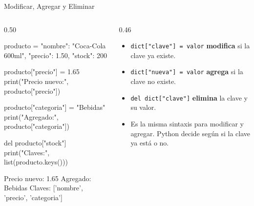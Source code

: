 \documentclass[aspectratio=169, 11pt]{beamer}
\begin{document}
\begin{frame}[fragile,shrink=30]{Modificar, Agregar y Eliminar}
  \vspace{-6pt}
  \begin{columns}[T]
    \begin{column}{0.50\textwidth}
      \begin{pyblock}
producto = {
    "nombre": "Coca-Cola 600ml",
    "precio": 1.50,
    "stock": 200
}

producto["precio"] = 1.65
print("Precio nuevo:", producto["precio"])

producto["categoria"] = "Bebidas"
print("Agregado:", producto["categoria"])

del producto["stock"]
print("Claves:", list(producto.keys()))
      \end{pyblock}
      \vspace{-2pt}
      \begin{outputblock}
Precio nuevo: 1.65
Agregado: Bebidas
Claves: ['nombre', 'precio', 'categoria']
      \end{outputblock}
    \end{column}

    \begin{column}{0.46\textwidth}
      \vspace{2pt}
      {\scriptsize\color{textMuted}
      \begin{itemize}\setlength{\itemsep}{4pt}
        \item[{\color{arcaRed}\scriptsize\faArrowRight}]
          \texttt{dict["clave"] = valor}
          \textbf{modifica} si la clave ya existe.
        \item[{\color{arcaRed}\scriptsize\faArrowRight}]
          \texttt{dict["nueva"] = valor}
          \textbf{agrega} si la clave no existe.
        \item[{\color{arcaRed}\scriptsize\faArrowRight}]
          \texttt{del dict["clave"]} \textbf{elimina}
          la clave y su valor.
        \item[{\color{arcaRed}\scriptsize\faLightbulb}]
          Es la misma sintaxis para modificar
          y agregar. Python decide según si
          la clave ya está o no.
      \end{itemize}
      }
    \end{column}
  \end{columns}
\end{frame}
\end{document}
